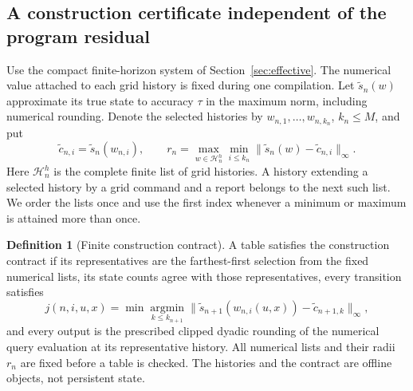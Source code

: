 \documentclass[11pt]{amsart}
\theoremstyle{definition}\newtheorem{definition}[theorem]{Definition}
\theoremstyle{remark}\newtheorem{remark}[theorem]{Remark}
\begin{document}
\subsection{A construction certificate independent of the program residual}
Use the compact finite-horizon system of Section~\ref{sec:effective}.
The numerical value attached to each grid history is fixed during one
compilation. Let $\widetilde s_n(w)$ approximate its true state to accuracy
$\tau$ in the maximum norm, including numerical rounding. Denote the
selected histories by $w_{n,1},\ldots,w_{n,k_n}$, $k_n\le M$, and put
\[
 \widetilde c_{n,i}=\widetilde s_n(w_{n,i}),\qquad
 r_n=\max_{w\in\mathcal H_n^h}\min_{i\le k_n}
             \|\widetilde s_n(w)-\widetilde c_{n,i}\|_\infty.
\]
Here $\mathcal H_n^h$ is the complete finite list of grid histories.
A history extending a selected history by a grid command and a report
belongs to the next such list. We order the lists once and use the first
index whenever a minimum or maximum is attained more than once.

\begin{definition}[Finite construction contract]\label{def:construction-contract}
A table satisfies the construction contract if its representatives are
the farthest-first selection from the fixed numerical lists, its state
counts agree with those representatives, every transition satisfies
\begin{equation}\label{eq:nearest-contract}
 j(n,i,u,x)=\min\operatorname*{argmin}_{k\le k_{n+1}}
 \|\widetilde s_{n+1}(w_{n,i}(u,x))-
                               \widetilde c_{n+1,k}\|_\infty,
\end{equation}
and every output is the prescribed clipped dyadic rounding of the
numerical query evaluation at its representative history. All numerical
lists and their radii $r_n$ are fixed before a table is checked.
The histories and the contract are offline objects, not persistent state.
\end{definition}
\end{document}
